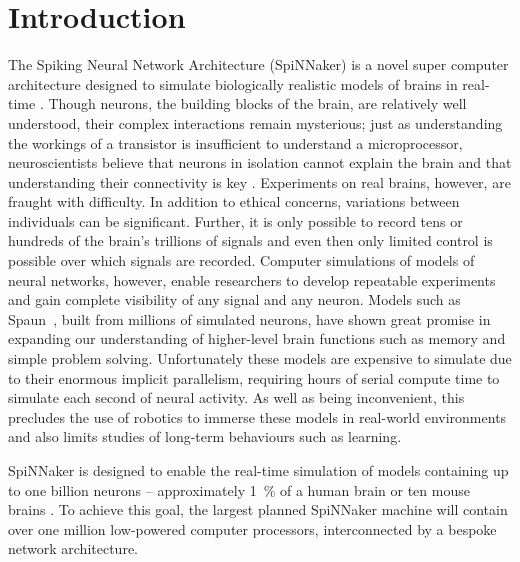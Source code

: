 \chapter{Introduction}

\label{sec:introduction}

%

The Spiking Neural Network Architecture (SpiNNaker) is a novel super computer
architecture designed to simulate biologically realistic models of brains in
real-time \cite{furber07}. Though neurons, the building blocks of the brain,
are relatively well understood, their complex interactions remain mysterious;
just as understanding the workings of a transistor is insufficient to
understand a microprocessor, neuroscientists believe that neurons in isolation
cannot explain the brain and that understanding their connectivity is key
\cite{eliasmith13,eliasmith14}. Experiments on real brains, however, are
fraught with difficulty. In addition to ethical concerns, variations between
individuals can be significant. Further, it is only possible to record tens or
hundreds of the brain's trillions of signals and even then only limited control
is possible over which signals are recorded. Computer simulations of models of
neural networks, however, enable researchers to develop repeatable experiments
and gain complete visibility of any signal and any neuron. Models such as
Spaun~\cite{eliasmith12}, built from millions of simulated neurons, have shown
great promise in expanding our understanding of higher-level brain functions
such as memory and simple problem solving. Unfortunately these models are
expensive to simulate due to their enormous implicit parallelism, requiring
hours of serial compute time to simulate each second of neural activity. As
well as being inconvenient, this precludes the use of robotics to immerse these
models in real-world environments and also limits studies of long-term
behaviours such as learning.

SpiNNaker is designed to enable the real-time simulation of models containing
up to one billion neurons -- approximately \SI{1}{\percent} of a human brain or
ten mouse brains \cite{furber06}. To achieve this goal, the largest planned
SpiNNaker machine will contain over one million low-powered computer
processors, interconnected by a bespoke network architecture.

